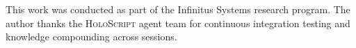 \documentclass[sigchi-a]{acmart}
\newcommand{\holoscript}{\textsc{HoloScript}}
\begin{document}

\begin{acks}
This work was conducted as part of the Infinitus Systems research program.
The author thanks the \holoscript{} agent team for continuous integration
testing and knowledge compounding across sessions.
\end{acks}




\end{document}
